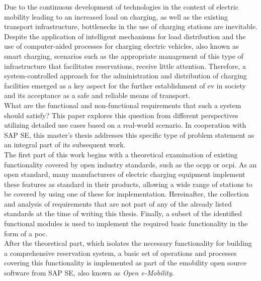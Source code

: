 

\Abstract
Due to the continuous development of technologies in the context of electric mobility leading to an increased load on charging, as well as the existing transport infrastructure, bottlenecks in the use of charging stations are inevitable.
Despite the application of intelligent mechanisms for load distribution and the use of computer-aided processes for charging electric vehicles, also known as smart charging, scenarios such as the appropriate management of this type of infrastructure that facilitates reservations, receive little attention. 
Therefore, a system-controlled approach for the administration and distribution of charging facilities emerged as a key aspect for the further establishment of \acrfull{ev} in society and its acceptance as a safe and reliable means of transport.\\
What are the functional and non-functional requirements that such a system should satisfy? This paper explores this question from different perspectives utilizing detailed use cases based on a real-world scenario.
In cooperation with SAP SE, this master's thesis addresses this specific type of problem statement as an integral part of its subsequent work.\\
The first part of this work begins with a theoretical examination of existing functionality covered by open industry standards, such as the \acrfull{ocpp} or \acrfull{ocpi}. 
As an open standard, many manufacturers of electric charging equipment implement these features as standard in their products, allowing a wide range of stations to be covered by using one of these for implementation.
Hereinafter, the collection and analysis of requirements that are not part of any of the already listed standards at the time of writing this thesis. 
Finally, a subset of the identified functional modules is used to implement the required basic functionality in the form of a \acrshort{poc}.\\
After the theoretical part, which isolates the necessary functionality for building a comprehensive reservation system, a basic set of operations and processes covering this functionality is implemented as part of the \acrshort{emobility} open source software from SAP SE, also known as \textit{Open e-Mobility}.
